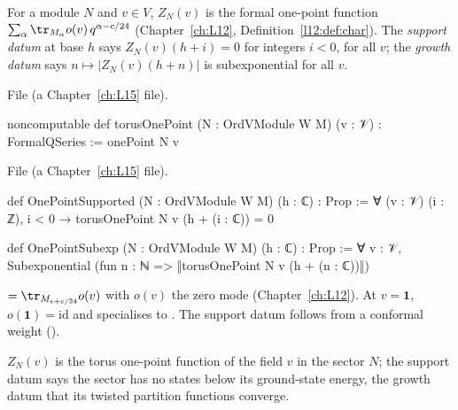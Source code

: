 \begin{definition}\label{l14:def:onepoint}
For a module $N$ and $v\in V$, $Z_N(v)$ is the formal one-point function $\sum_\alpha\tr_{M_\alpha}o(v)\,q^{\alpha-c/24}$
(Chapter~\ref{ch:L12}, Definition~\ref{l12:def:char}). The \emph{support datum} at base $h$ says $Z_N(v)(h+i) = 0$ for integers
$i<0$, for all $v$; the \emph{growth datum} says $n\mapsto|Z_N(v)(h+n)|$ is subexponential for all $v$.
\end{definition}
\noindent File  (a Chapter~\ref{ch:L15} file).
\begin{leancode}
noncomputable def torusOnePoint (N : OrdVModule W M) (v : 𝒱) : FormalQSeries := onePoint N v
\end{leancode}
\noindent File  (a Chapter~\ref{ch:L15} file).
\begin{leancode}
def OnePointSupported (N : OrdVModule W M) (h : ℂ) : Prop :=
  ∀ (v : 𝒱) (i : ℤ), i < 0 → torusOnePoint N v (h + (i : ℂ)) = 0

def OnePointSubexp (N : OrdVModule W M) (h : ℂ) : Prop :=
  ∀ v : 𝒱, Subexponential (fun n : ℕ => ‖torusOnePoint N v (h + (n : ℂ))‖)
\end{leancode}
\begin{dictionary}
 $=\tr_{M_{e+c/24}}o(v)$ with $o(v)$ the zero mode (Chapter~\ref{ch:L12}). At $v=\mathbf 1$, $o(\mathbf
1) = \mathrm{id}$ and  specialises to . The support datum follows from a
conformal weight ().
\end{dictionary}
\begin{physics}
$Z_N(v)$ is the torus one-point function of the field $v$ in the sector $N$; the support datum says the sector has no states below its ground-state energy, the growth datum that its twisted partition functions converge.
\end{physics}

